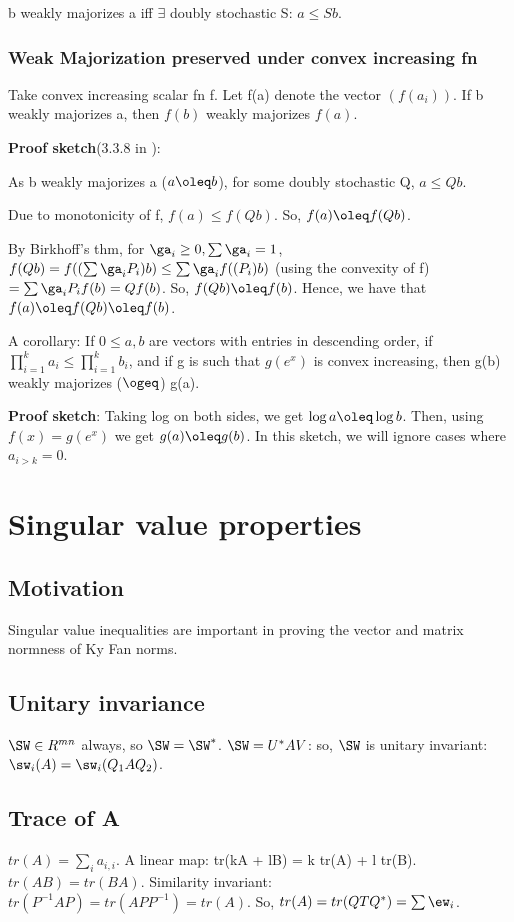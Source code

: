 \documentclass[10pt]{amsart}
\newcommand{\proofSketch}{\textbf{Proof sketch}}
\begin{document}
b weakly majorizes a iff $\exists$ doubly stochastic S: $a \leq Sb$.

\subsubsection{Weak Majorization preserved under convex increasing fn}
Take convex increasing scalar fn f. Let f(a) denote the vector $(f(a_{i}))$. If b weakly majorizes a, then $f(b)$ weakly majorizes $f(a)$.

\proofSketch (3.3.8 in \cite{hornJohnsonTopics}):

As b weakly majorizes a ($a \oleq b$), for some doubly stochastic Q, $a \leq Qb$.

Due to monotonicity of f, $f(a) \leq f(Qb)$. So, $f(a) \oleq f(Qb)$.

By Birkhoff's thm, for $\ga_{i} \geq0, \sum \ga_{i} = 1$, $f(Qb) = f((\sum \ga_{i}P_{i})b) \leq \sum \ga_{i}f((P_{i})b)$ (using the convexity of f) $ = \sum \ga_{i}P_{i}f(b) = Qf(b)$. So, $f(Qb) \oleq f(b)$. Hence, we have that $f(a) \oleq f(Qb)\oleq f(b)$. \finish

A corollary: If $0 \leq a, b$ are vectors with entries in descending order, if $\prod_{i=1}^{k}a_{i} \leq \prod_{i=1}^{k} b_{i}$, and if g is such that $g(e^{x})$ is convex increasing, then g(b) weakly majorizes ($\ogeq$) g(a).

\proofSketch: Taking log on both sides, we get $\log a \oleq \log b$. Then, using $f(x) = g(e^{x})$ we get $g(a) \oleq g(b)$. In this sketch, we will ignore cases where $a_{i > k} = 0$.


\section{Singular value \htext{$\SW$}{} properties}
\subsection{Motivation}
Singular value inequalities are important in proving the vector and matrix normness of Ky Fan norms.

\subsection{Unitary invariance}
$\SW \in R^{mn}$ always, so $\SW = \SW^{*}$. $\SW = U^{*}AV$: so, $\SW$ is unitary invariant: $\sw_{i}(A) = \sw_{i}(Q_{1}AQ_{2})$.

\subsection{Trace of A}
$tr(A) = \sum_{i} a_{i,i}$. A linear map: tr(kA + lB) = k tr(A) + l tr(B). $tr(AB) = tr(BA)$. Similarity invariant: $tr(P^{-1}AP) = tr(APP^{-1}) = tr(A)$. So, $tr(A) = tr(QTQ^{*}) = \sum \ew_{i}$.
\end{document}
